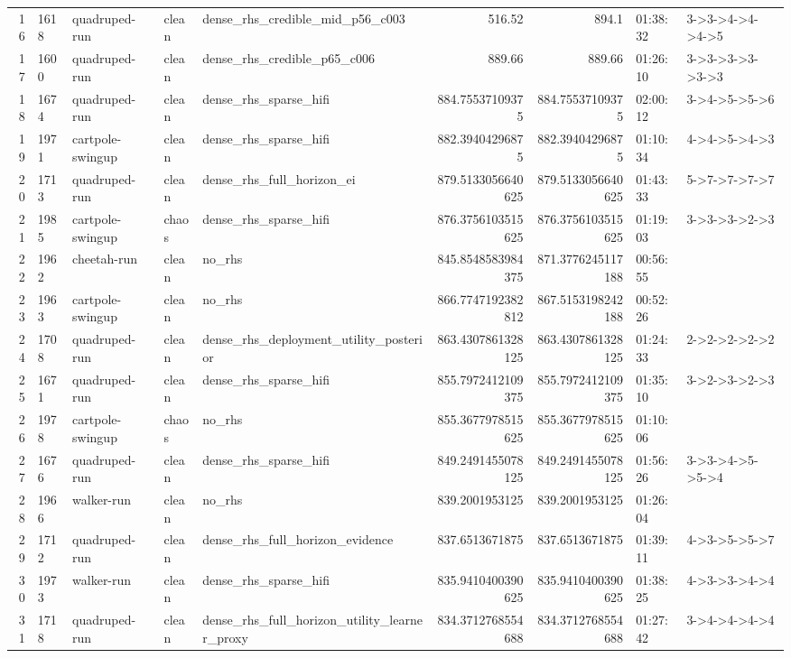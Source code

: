 \begin{tabular}{rllllrrll}
16 & 1618 & quadruped-run & clean & dense\_rhs\_credible\_mid\_p56\_c003 & 516.52 & 894.1 & 01:38:32 & 3->3->4->4->4->5 \\
17 & 1600 & quadruped-run & clean & dense\_rhs\_credible\_p65\_c006 & 889.66 & 889.66 & 01:26:10 & 3->3->3->3->3->3 \\
18 & 1674 & quadruped-run & clean & dense\_rhs\_sparse\_hifi & 884.75537109375 & 884.75537109375 & 02:00:12 & 3->4->5->5->6 \\
19 & 1971 & cartpole-swingup & clean & dense\_rhs\_sparse\_hifi & 882.39404296875 & 882.39404296875 & 01:10:34 & 4->4->5->4->3 \\
20 & 1713 & quadruped-run & clean & dense\_rhs\_full\_horizon\_ei & 879.5133056640625 & 879.5133056640625 & 01:43:33 & 5->7->7->7->7 \\
21 & 1985 & cartpole-swingup & chaos & dense\_rhs\_sparse\_hifi & 876.3756103515625 & 876.3756103515625 & 01:19:03 & 3->3->3->2->3 \\
22 & 1962 & cheetah-run & clean & no\_rhs & 845.8548583984375 & 871.3776245117188 & 00:56:55 &  \\
23 & 1963 & cartpole-swingup & clean & no\_rhs & 866.7747192382812 & 867.5153198242188 & 00:52:26 &  \\
24 & 1708 & quadruped-run & clean & dense\_rhs\_deployment\_utility\_posterior & 863.4307861328125 & 863.4307861328125 & 01:24:33 & 2->2->2->2->2 \\
25 & 1671 & quadruped-run & clean & dense\_rhs\_sparse\_hifi & 855.7972412109375 & 855.7972412109375 & 01:35:10 & 3->2->3->2->3 \\
26 & 1978 & cartpole-swingup & chaos & no\_rhs & 855.3677978515625 & 855.3677978515625 & 01:10:06 &  \\
27 & 1676 & quadruped-run & clean & dense\_rhs\_sparse\_hifi & 849.2491455078125 & 849.2491455078125 & 01:56:26 & 3->3->4->5->5->4 \\
28 & 1966 & walker-run & clean & no\_rhs & 839.2001953125 & 839.2001953125 & 01:26:04 &  \\
29 & 1712 & quadruped-run & clean & dense\_rhs\_full\_horizon\_evidence & 837.6513671875 & 837.6513671875 & 01:39:11 & 4->3->5->5->7 \\
30 & 1973 & walker-run & clean & dense\_rhs\_sparse\_hifi & 835.9410400390625 & 835.9410400390625 & 01:38:25 & 4->3->3->4->4 \\
31 & 1718 & quadruped-run & clean & dense\_rhs\_full\_horizon\_utility\_learner\_proxy & 834.3712768554688 & 834.3712768554688 & 01:27:42 & 3->4->4->4->4 \\

\end{tabular}
